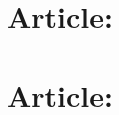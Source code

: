 \clearpage

\mainmatter
\pagestyle{thesis}







\begin{appendices}
\changeappendixmark%

\chapter{Article: \articleCceTitle}
\label{ax:article-cce}
\chapter{Article: \articleReviewTitle}
\label{ax:article-review}


\end{appendices}



\cleardoublepage


